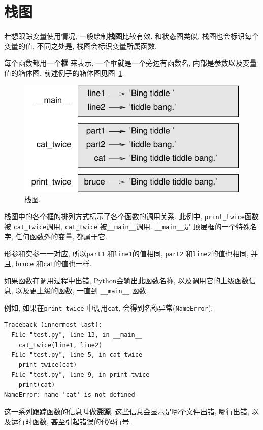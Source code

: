 \documentclass[10pt]{book}
\begin{document}
\section{栈图}
\label{stackdiagram}
若想跟踪变量使用情况, 一般绘制{\bf 栈图}比较有效. 
和状态图类似, 栈图也会标识每个变量的值, 不同之处是, 
栈图会标识变量所属函数. 

每个函数都用一个{\bf 框} 来表示, 一个框就是一个旁边有函数名, 
内部是参数以及变量值的箱体图. 
前述例子的箱体图见图~\ref{fig.stack}. 

\begin{figure}
\centerline
{\includegraphics[scale=0.8]{figs/stack.pdf}}
\caption{栈图.}
\label{fig.stack}
\end{figure}

栈图中的各个框的排列方式标示了各个函数的调用关系. 
此例中, \verb"print_twice"函数被 \verb"cat_twice"调用, 
\verb"cat_twice" 被\verb"__main__"调用. \verb"__main__"是
顶层框的一个特殊名字, 任何函数外的变量, 都属于它. 

形参和实参一一对应, 所以{\tt part1} 和{\tt line1}的值相同, 
{\tt part2} 和{\tt line2}的值也相同, 并且, 
 {\tt bruce} 和{\tt cat}的值也一样. 

如果函数在调用过程中出错, Python会输出此函数名称, 
以及调用它的上级函数信息, 以及更上级的函数, 一直到 \verb"__main__" 函数.

例如, 如果在\verb"print_twice" 中调用{\tt cat}, 会得到名称异常({\tt NameError}):

\begin{verbatim}
Traceback (innermost last):
  File "test.py", line 13, in __main__
    cat_twice(line1, line2)
  File "test.py", line 5, in cat_twice
    print_twice(cat)
  File "test.py", line 9, in print_twice
    print(cat)
NameError: name 'cat' is not defined
\end{verbatim}
%
这一系列跟踪函数的信息叫做{\bf 溯源}, 这些信息会显示是哪个文件出错, 哪行出错, 
以及运行时函数, 甚至引起错误的代码行号. 
\end{document}
